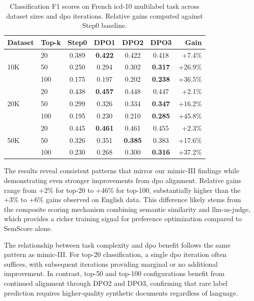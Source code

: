\begin{table}[htb]
\centering
\begin{tabular}{@{}llccccr@{}}
\toprule
\textbf{Dataset} & \textbf{Top-k} & \textbf{Step0} & \textbf{DPO1} & \textbf{DPO2} & \textbf{DPO3} & \textbf{Gain} \\
\midrule
\multirow{3}{*}{10K}
    & 20  & 0.389 & \textbf{0.422} & 0.422 & 0.418 & +7.4\% \\
    & 50  & 0.250 & 0.294 & 0.302 & \textbf{0.317} & +26.9\% \\
    & 100 & 0.175 & 0.197 & 0.202 & \textbf{0.238} & +36.5\% \\
\midrule
\multirow{3}{*}{20K}
    & 20  & 0.438 & \textbf{0.457} & 0.448 & 0.447 & +2.1\% \\
    & 50  & 0.299 & 0.326 & 0.334 & \textbf{0.347} & +16.2\% \\
    & 100 & 0.195 & 0.230 & 0.210 & \textbf{0.285} & +45.8\% \\
\midrule
\multirow{3}{*}{50K}
    & 20  & 0.445 & \textbf{0.461} & 0.461 & 0.455 & +2.3\% \\
    & 50  & 0.326 & 0.351 & \textbf{0.385} & 0.383 & +17.6\% \\
    & 100 & 0.230 & 0.268 & 0.300 & \textbf{0.316} & +37.2\% \\
\bottomrule
\end{tabular}
\caption{Classification F1 scores on French \gls{icd}-10 multilabel task across dataset sizes and \gls{dpo} iterations.
Relative gains computed against Step0 baseline.}
\label{tab:french-results}
\end{table}

The results reveal consistent patterns that mirror our \gls{mimic}-III findings while demonstrating even stronger improvements from \gls{dpo} alignment.
Relative gains range from +2\% for top-20 to +46\% for top-100, substantially higher than the +3\% to +6\% gains observed on English data.
This difference likely stems from the composite scoring mechanism combining semantic similarity and \gls{llm}-as-judge, which provides a richer training signal for preference optimization compared to SemScore alone.

The relationship between task complexity and \gls{dpo} benefit follows the same pattern as \gls{mimic}-III.
For top-20 classification, a single \gls{dpo} iteration often suffices, with subsequent iterations providing marginal or no additional improvement.
In contrast, top-50 and top-100 configurations benefit from continued alignment through DPO2 and DPO3, confirming that rare label prediction requires higher-quality synthetic documents regardless of language.

